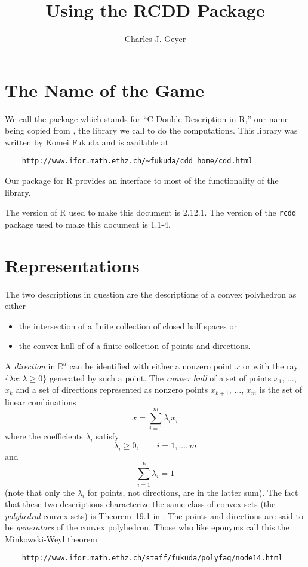 \documentclass{article}
\newcommand{\real}{\mathbb{R}}
\begin{document}
\title{Using the RCDD Package}
\author{Charles J. Geyer}
\maketitle



\section{The Name of the Game}

We call the package \verb@rcdd@ which stands
for ``C Double Description in R,'' our name being copied from
\verb@cddlib@, the library we call to do the computations.
This library was written by Komei Fukuda and is available at
\begin{verbatim}
    http://www.ifor.math.ethz.ch/~fukuda/cdd_home/cdd.html
\end{verbatim}
Our \verb@rcdd@ package for R provides an interface to most
of the functionality of the \verb@cddlib@ library.

The version of R used to make this document is 2.12.1.  The version
of the \texttt{rcdd} package used to make this document is 1.1-4.

\section{Representations}

The two descriptions in question are the descriptions of a convex polyhedron
as either
\begin{itemize}
\item the intersection of a finite collection of closed half spaces or
\item the convex hull of of a finite collection of points and directions.
\end{itemize}

A \emph{direction} in $\real^d$ can be identified with
either a nonzero point $x$ or with
the ray $\{ \lambda x : \lambda \ge 0 \}$ generated by such a point.  
The \emph{convex hull} of a set of points $x_1$, $\ldots$, $x_k$ and
a set of directions represented as nonzero
points $x_{k + 1}$, $\ldots$, $x_m$ is the set of linear
combinations
$$
   x = \sum_{i = 1}^m \lambda_i x_i
$$
where the coefficients $\lambda_i$ satisfy
$$
   \lambda_i \ge 0, \qquad i = 1, \ldots, m
$$
and
$$
   \sum_{i = 1}^k \lambda_i = 1
$$
(note that only the $\lambda_i$ for points, not directions,
are in the latter sum).
The fact that these two descriptions characterize the same class of
convex sets (the \emph{polyhedral} convex sets) is Theorem~19.1
in \citet{rocky}.
The points and directions are said to be \emph{generators} of the
convex polyhedron.  Those who like eponyms call this the
Minkowski-Weyl theorem
\begin{verbatim}
    http://www.ifor.math.ethz.ch/staff/fukuda/polyfaq/node14.html
\end{verbatim}
\end{document}
